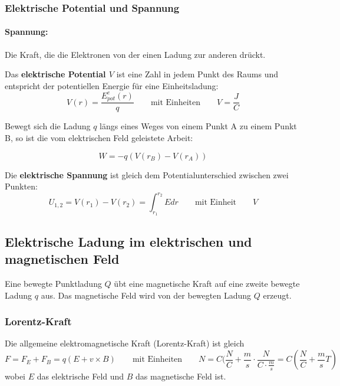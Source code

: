 \documentclass[11pt]{article}
\begin{document}
\subsubsection{Elektrische Potential und Spannung}

\paragraph{Spannung:} Die Kraft, die die Elektronen von der einen Ladung zur anderen drückt.

Das \textbf{elektrische Potential $V$} ist eine Zahl in jedem Punkt des Raums und entspricht der potentiellen Energie f{\"u}r eine Einheitsladung:
\begin{equation*}
	V(r) = \frac{E_{pot}^e(r)}{q} \qquad\text{mit Einheiten}\qquad V = \frac{J}{C}
\end{equation*}

Bewegt sich die Ladung $q$ l{\"a}ngs eines Weges von einem Punkt A zu einem Punkt B, so ist die vom elektrischen Feld geleistete Arbeit:

\begin{equation*}
	W = -q(V(r_B) - V(r_A))
\end{equation*}

Die \textbf{elektrische Spannung} ist gleich dem Potentialunterschied zwischen zwei Punkten:
\begin{equation*}
	U_{1,2} = V(r_1) - V(r_2) = \int_{r_1}^{r_2}E dr \qquad\text{mit Einheit}\qquad V
\end{equation*}

\subsection{Elektrische Ladung im elektrischen und magnetischen Feld}

Eine bewegte Punktladung $Q$ {\"u}bt eine magnetische Kraft auf eine zweite bewegte Ladung $q$ aus. Das magnetische Feld wird von der bewegten Ladung $Q$ erzeugt.

\subsubsection{Lorentz-Kraft}

Die allgemeine elektromagnetische Kraft (Lorentz-Kraft) ist gleich
\begin{equation*}
	F = F_E + F_B = q(E + v \times B) \qquad\text{mit Einheiten}\qquad N = C(\frac{N}{C} + \frac{m}{s}\cdot\frac{N}{C\cdot\frac{m}{s}} = C(\frac{N}{C} + \frac{m}{s}T)
\end{equation*}
wobei $E$ das elektrische Feld und $B$ das magnetische Feld ist. 
\end{document}
